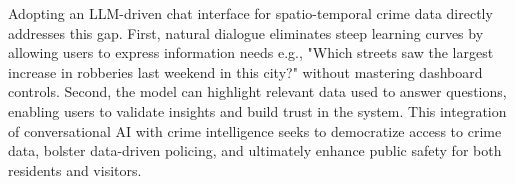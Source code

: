 
Adopting an LLM-driven chat interface for spatio-temporal crime data directly addresses this gap. First, natural dialogue eliminates steep learning curves by allowing users to express information needs e.g., "Which streets saw the largest increase in robberies last weekend in this city?" without mastering dashboard controls. Second, the model can highlight relevant data used to answer questions, enabling users to validate insights and build trust in the system. This integration of conversational AI with crime intelligence seeks to democratize access to crime data, bolster data-driven policing, and ultimately enhance public safety for both residents and visitors.







